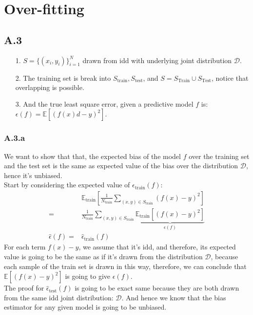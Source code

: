\documentclass[]{article}
\begin{document}
\section*{Over-fitting}
    \subsection*{A.3}
        \begin{enumerate}
        \item[1.] $S = \{(x_i, y_i)\}_{i = 1}^N$ drawn from idd with underlying joint distribution $\mathcal{D}$. 
        \item[2.] The training set is break into $S_\text{train}, S_\text{test}$, and $S = S_\text{Train} \cup S_\text{Test}$, notice that overlapping is possible. 
        \item[3.] And the true least square error, given a predictive model $f$ is: $\epsilon(f) = \mathbb{E}\left[(f(x) d - y)^2\right]$. 
        \end{enumerate}
    \subsubsection*{A.3.a}
        We want to show that that, the expected bias of the model $f$ over the training set and the test set is the same as expected value of the bias over the distribution $\mathcal{D}$, hence it's unbiased. 
        \\[1em]
        Start by considering the expected value of $\epsilon_\text{train}(f)$: 
        \begin{align*}\tag{A.3.a.1}\label{eqn:A.3.a.1}
            & \mathbb{E}_{\text{train}}\left[\frac{1}{N_\text{train}}
            \sum_{(x, y)\in S_\text{train}}^{}\left(
                f(x) - y
            \right)^2\right]
            \\
            = &
            \frac{1}{N_\text{train}} 
            \sum_{(x, y)\in S_\text{train}}^{}
            \underbrace{
                \mathbb{E}_{\text{train}}
                \left[ 
                \left(
                    f(x) - y
                \right)^2\right]
            }_{\epsilon(f)}
            \\
            \hat{\epsilon}(f)
            = &
            \hat{\epsilon}_{\text{train}}(f)
        \end{align*}
        For each term $f(x) - y$, we assume that it's idd, and therefore, its expected value is going to be the same as if it's drawn from the distribution $\mathcal{D}$, because each sample of the train set is drawn in this way, therefore, we can conclude that $\mathbb{E}\left[(f(x) - y)^2\right]$ is going to give $\epsilon(f)$. 
        \\[1em]
        The proof for $\hat{\epsilon}_\text{test}(f)$ is going to be exact same because they are both drawn from the same idd joint distribution: $\mathcal{D}$. And hence we know that the bias estimator for any given model is going to be unbiased. 
\end{document}

